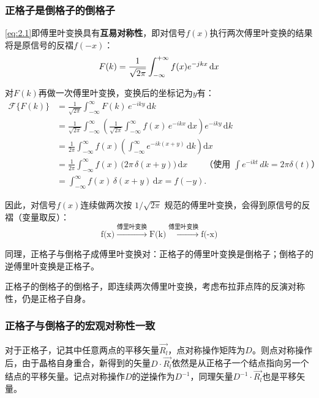 \subsubsection{正格子是倒格子的倒格子}
    \autoref{eq:2.1}即傅里叶变换具有\textbf{互易对称性}，即对信号$f(x)$执行两次傅里叶变换的结果将是原信号的反褶$f(-x)$：
    \[
        F(k)=\frac{1}{\sqrt{2\pi}}\int_{-\infty}^{+\infty} f(x)e^{-jkx} \,\mathrm{d}x\\
    \]
    
    对$F(k)$再做一次傅里叶变换，变换后的坐标记为$y$有：
    \begin{align*}
    \mathcal{F}\{F(k)\}
    &=\frac{1}{\sqrt{2\pi}}\int_{-\infty}^{\infty} F(k)\,e^{-iky}\,\mathrm{d}k \\
    &=\frac{1}{\sqrt{2\pi}}\int_{-\infty}^{\infty}
    \left(\frac{1}{\sqrt{2\pi}}\int_{-\infty}^{\infty} f(x)\,e^{-ikx}\,\mathrm{d}x\right)
    e^{-iky}\,\mathrm{d}k \\
    &=\frac{1}{2\pi}\int_{-\infty}^{\infty} f(x)
    \left(\int_{-\infty}^{\infty} e^{-ik(x+y)}\,\mathrm{d}k\right)\mathrm{d}x \\
    &=\frac{1}{2\pi}\int_{-\infty}^{\infty} f(x)\,\bigl(2\pi\,\delta(x+y)\bigr)\,\mathrm{d}x
    \qquad\text{（使用 }\int e^{-ik t}\,dk=2\pi\delta(t)\text{）} \\
    &=\int_{-\infty}^{\infty} f(x)\,\delta(x+y)\,\mathrm{d}x
    = f(-y).
    \end{align*}

    因此，对信号$f(x)$连续做两次按 \(1/\sqrt{2\pi}\) 规范的傅里叶变换，会得到原信号的反褶（变量取反）：
    \[
    \mbox{f(x)}\xrightarrow{\mbox{傅里叶变换}}\mbox{F(k)}\xrightarrow{\mbox{傅里叶变换}}\mbox{f(-x)}
    \]

    同理，正格子与倒格子成傅里叶变换对：正格子的傅里叶变换是倒格子；倒格子的逆傅里叶变换是正格子。
    
    正格子的倒格子的倒格子，即连续两次傅里叶变换，考虑布拉菲点阵的反演对称性，仍是正格子自身。

\subsubsection{正格子与倒格子的宏观对称性一致}
    对于正格子，记其中任意两点的平移矢量$\vec{R_l}$，点对称操作矩阵为$D$。则点对称操作后，由于晶格自身重合，新得到的矢量$D\cdot \vec{R_l}$依然是从正格子一个结点指向另一个结点的平移矢量。记点对称操作$D$的逆操作为$D^{-1}$，同理矢量$D^{-1}\cdot \vec{R_l}$也是平移矢量。

